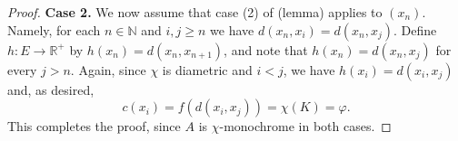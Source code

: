 \begin{proof}
\textbf{Case 2.} We now assume that case (2) of (lemma) applies to \( (x_{n}) \). Namely, for each \( n \in \mathbb{N}  \) and \( i,j \geq n \) we have \( d(x_{n} , x_{i} ) = d(x_{n} , x_{j} ) \). Define \( h : E \to \mathbb{R}^{+}  \) by \( h(x_{n} ) = d(x_{n} , x_{n+1} )\), and note that \( h(x_{n} ) = d(x_{n} , x_{j}) \) for every \( j > n \). Again, since \( \chi \) is diametric and \( i < j\), we have \( h(x_{i} ) = d(x_{i} , x_{j} )\) and, as desired, \[ c(x_{i}) = f(d(x_{i} , x_{j} )) = \chi (K) = \varphi. \] This completes the proof, since \( A \) is \( \chi \)-monochrome in both cases.
\end{proof}
